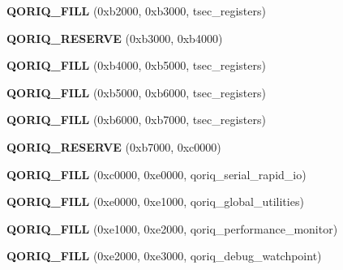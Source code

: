 \begin{DoxyCompactItemize}
\item 
\mbox{\label{structqoriq__ccsr_aad0fd6ef72bcf94d08ede3a83e89c07c}} 
{\bfseries Q\+O\+R\+I\+Q\+\_\+\+F\+I\+LL} (0xb2000, 0xb3000, tsec\+\_\+registers)
\item 
\mbox{\label{structqoriq__ccsr_afb32bfbe980689d00c43412ff06b8174}} 
{\bfseries Q\+O\+R\+I\+Q\+\_\+\+R\+E\+S\+E\+R\+VE} (0xb3000, 0xb4000)
\item 
\mbox{\label{structqoriq__ccsr_ad93e5f23bd356d6b04f0c456943361b8}} 
{\bfseries Q\+O\+R\+I\+Q\+\_\+\+F\+I\+LL} (0xb4000, 0xb5000, tsec\+\_\+registers)
\item 
\mbox{\label{structqoriq__ccsr_abbfd303c868b93c578d9d3bd9ae2ad1a}} 
{\bfseries Q\+O\+R\+I\+Q\+\_\+\+F\+I\+LL} (0xb5000, 0xb6000, tsec\+\_\+registers)
\item 
\mbox{\label{structqoriq__ccsr_a961160a49f03a89b2a38dc44372a1242}} 
{\bfseries Q\+O\+R\+I\+Q\+\_\+\+F\+I\+LL} (0xb6000, 0xb7000, tsec\+\_\+registers)
\item 
\mbox{\label{structqoriq__ccsr_a2c550ece246e408d5ddec084a6ee088c}} 
{\bfseries Q\+O\+R\+I\+Q\+\_\+\+R\+E\+S\+E\+R\+VE} (0xb7000, 0xc0000)
\item 
\mbox{\label{structqoriq__ccsr_ad47c5cf104a9455d768b34b4603aed48}} 
{\bfseries Q\+O\+R\+I\+Q\+\_\+\+F\+I\+LL} (0xc0000, 0xe0000, qoriq\+\_\+serial\+\_\+rapid\+\_\+io)
\item 
\mbox{\label{structqoriq__ccsr_a8dcfb24365dfeccff4d74143b4f121bf}} 
{\bfseries Q\+O\+R\+I\+Q\+\_\+\+F\+I\+LL} (0xe0000, 0xe1000, qoriq\+\_\+global\+\_\+utilities)
\item 
\mbox{\label{structqoriq__ccsr_a486ee02abc5adda8bcbdf9ceb5995a37}} 
{\bfseries Q\+O\+R\+I\+Q\+\_\+\+F\+I\+LL} (0xe1000, 0xe2000, qoriq\+\_\+performance\+\_\+monitor)
\item 
\mbox{\label{structqoriq__ccsr_afad6b12e4a036d47747ed86769907662}} 
{\bfseries Q\+O\+R\+I\+Q\+\_\+\+F\+I\+LL} (0xe2000, 0xe3000, qoriq\+\_\+debug\+\_\+watchpoint)

\end{DoxyCompactItemize}
